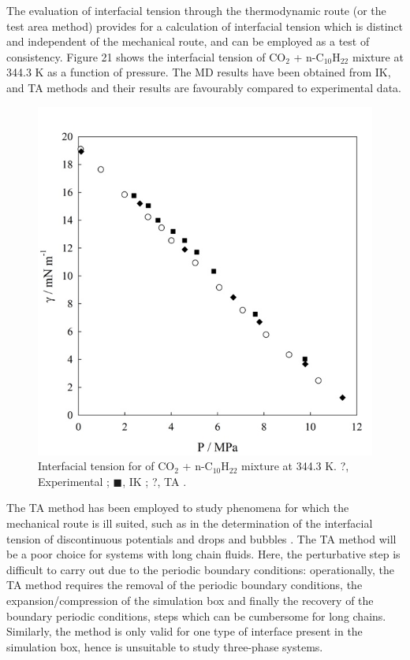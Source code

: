 \documentclass{scrbook}
\begin{document}
The evaluation of interfacial tension through the thermodynamic route (or the
test area method) provides for a calculation of interfacial tension which is
distinct and independent of the mechanical route, and can be employed as a test
of consistency. Figure 21 shows the interfacial tension of CO$_{2}$
+ n-C$_{10}$H$_{22}$ mixture at 344.3 K as a function of pressure. The MD
results have been obtained from IK, and TA methods and their results are
favourably compared to experimental data.
\begin{figure}
\includegraphics[width=1\textwidth]{gfx/image67.jpeg}
\caption{Interfacial tension for of CO$_{2}$ + n-C$_{10}$H$_{22}$ mixture at 344.3 K. ?, Experimental \citep{mejia2014a}; ${\blacksquare}$, IK \citep{mejia2014a}; ?, TA \citep{muller2009} .}
\label{fig:21}
\end{figure}
The TA method has been employed to study phenomena for which the mechanical route
is ill suited, such as in the determination of the interfacial tension of
discontinuous potentials \citep{gloor2005}
and drops and bubbles \citep{sampayo2010}. The TA method will be a poor choice
for systems with long chain fluids. Here, the perturbative step is difficult to
carry out due to the periodic boundary conditions: operationally, the TA method
requires the removal of the periodic boundary conditions, the
expansion/compression of the simulation box and finally the recovery of the
boundary periodic conditions, steps which can be cumbersome for long chains.
Similarly, the method is only valid for one type of interface present in the
simulation box, hence is unsuitable to study three-phase systems. 
\end{document}
